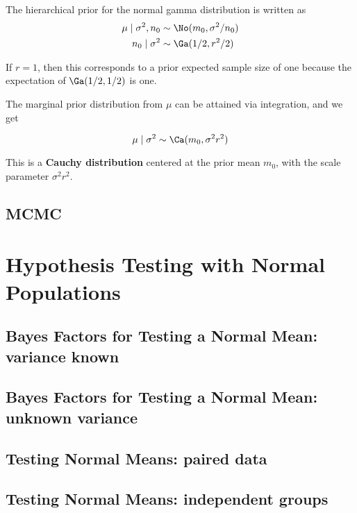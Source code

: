 \documentclass[]{book}
\theoremstyle{definition}
\theoremstyle{definition}
\theoremstyle{definition}
\theoremstyle{remark}
\begin{document}
The hierarchical prior for the normal gamma distribution is written as
\[\begin{aligned}
\mu \mid \sigma^2, n_0 & \sim \No(m_0, \sigma^2/n_0) \\
n_0 \mid \sigma^2 &  \sim \Ga(1/2, r^2/2)
\end{aligned}\]

If \(r=1\), then this corresponds to a prior expected sample size of one
because the expectation of \(\Ga(1/2,1/2)\) is one.

The marginal prior distribution from \(\mu\) can be attained via
integration, and we get

\[\mu \mid \sigma^2  \sim  \Ca(m_0, \sigma^2 r^2)\]

This is a \textbf{Cauchy distribution} centered at the prior mean
\(m_0\), with the scale parameter \(\sigma^2 r^2\).

\subsection{MCMC}\label{sec:NG-MCMC}

\section{Hypothesis Testing with Normal
Populations}\label{hypothesis-testing-with-normal-populations}

\subsection{Bayes Factors for Testing a Normal Mean: variance
known}\label{bayes-factors-for-testing-a-normal-mean-variance-known}

\subsection{Bayes Factors for Testing a Normal Mean: unknown
variance}\label{bayes-factors-for-testing-a-normal-mean-unknown-variance}

\subsection{Testing Normal Means: paired
data}\label{testing-normal-means-paired-data}

\subsection{Testing Normal Means: independent
groups}\label{testing-normal-means-independent-groups}
\end{document}
